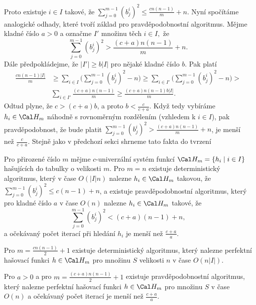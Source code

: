 \documentclass[a4paper,12pt]{article}
\begin{document}
Proto existuje $i\in I$ takové, že $\sum_{j=0}^{m-
1}(b^i_j)^2\le\frac {cn(n-1)}m+n$. Nyní 
spočítáme analogické odhady, které tvoří základ pro 
pravděpodobnostní algoritmus. Mějme kladné číslo $
a>0$ a 
označme $I'$ množinu těch $i\in I,$ že  
$$\sum_{j=0}^{m-1}(b^i_j)^2>\frac {(c+a)n(n-1)}m+n.$$
Dále předpokládejme, že $|I'|\ge b|I|$ pro 
nějaké kladné číslo $b$. Pak platí 
\begin{align*}\frac {cn(n-1)|I|}m&\ge\sum_{i\in I}\big(\sum_{j=0}^{m-1}
(b^i_j)^2-n\big)\ge\sum_{i\in I'}\big(\sum_{j=0}^{m-1}(b^i_j)^2-n\big
)>\\
&\sum_{i\in I'}\frac {(c+a)n(n-1)}m\ge\frac {(c+a)n(n-1)b|I|}m.\end{align*}
Odtud plyne, že $c>(c+a)b$, a proto $b<\frac c{c+a}$. Když tedy vybíráme  
$h_i\in \Cal H_m$ náhodně s rovnoměrným rozdělením (vzhledem k $
i\in I$), pak 
pravděpo\-dobnost, že bude platit $\sum_{j=0}^{m-1}(b^i_j)^
2>\frac {(c+a)n(n-1)}m+n$, je 
menší než $\frac c{c+a}$. Stejně jako v předchozí sekci shrneme tato fakta do tvrzení 

\begin{tvrzeni}Pro přirozené číslo $m$ mějme $
c$-univerzální systém funkcí $\Cal H_m=\{h_i\mid i\in 
I\}$ hašujících do tabulky o velikosti 
$m$. Pro $m=n$ existuje deterministický algoritmus, 
který v čase $O(|I|n)$ nalezne $h_i\in \Cal H_m$ takovou, že $
\sum_{j=0}^{m-1}(b^i_j)^2\le c(n-1)+n$, 
a existuje pravděpodobnostní algoritmus, který pro kladné číslo 
$a$ v čase $O(n)$ nalezne $h_i\in \Cal H_m$ takové, že 
$$\sum_{j=0}^{m-1}(b^i_j)^2<(c+a)(n-1)+n,$$
a očekávaný počet iterací při hledání $h_i$ je menší než $\frac {
c+a}a$.   

Pro $m=\frac {cn(n-1)}2+1$ existuje deterministický algoritmus, 
který nalezne perfektní hašovací funkci  $h\in \Cal H_
m$ pro množinu $S$ 
velikosti $n$ v čase $O(n|I|)$.

Pro $a>0$ a pro $m=\frac {(c+a)n(n-1)}2+1$ existuje 
pravděpodobnostní algoritmus, který nalezne perfektní hašovací 
funkci $h\in \Cal H_m$ pro množinu $S$ v čase $O(n)$ a očekávaný počet 
iterací je menší než $\frac {c+a}a$.  
\end{tvrzeni}
\end{document}
